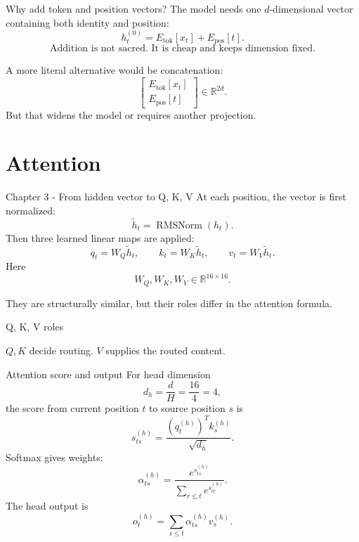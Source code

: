 \documentclass[
  xcolor={svgnames,dvipsnames},
  hyperref={pagebackref,bookmarks},
  aspectratio=169,
  11pt
]{beamer}
\begin{document}
\begin{frame}{Why add token and position vectors?}
The model needs one $d$-dimensional vector containing both identity and position:
\[
h_t^{(0)}=E_{\mathrm{tok}}[x_t]+E_{\mathrm{pos}}[t].
\]
\[
\boxed{\text{Addition is not sacred. It is cheap and keeps dimension fixed.}}
\]

\vspace{0.3cm}
A more literal alternative would be concatenation:
\[
\begin{bmatrix}E_{\mathrm{tok}}[x_t]\\E_{\mathrm{pos}}[t]\end{bmatrix}\in\mathbb R^{2d}.
\]
But that widens the model or requires another projection.
\end{frame}

\section{Attention}
\begin{frame}{Chapter 3 - From hidden vector to Q, K, V}
At each position, the vector is first normalized:
\[
\tilde h_t=\operatorname{RMSNorm}(h_t).
\]
Then three learned linear maps are applied:
\[
q_t=W_Q\tilde h_t,\qquad k_t=W_K\tilde h_t,\qquad v_t=W_V\tilde h_t.
\]
Here
\[
W_Q,W_K,W_V\in\mathbb R^{16\times16}.
\]

They are structurally similar, but their roles differ in the attention formula.
\end{frame}

\begin{frame}{Q, K, V roles}
\centering
{}

\vspace{0.5cm}
$Q,K$ decide routing. $V$ supplies the routed content.
\end{frame}

\begin{frame}{Attention score and output}
For head dimension
\[
d_h=\frac{d}{H}=\frac{16}{4}=4,
\]
the score from current position $t$ to source position $s$ is
\[
s_{ts}^{(h)}=\frac{(q_t^{(h)})^T k_s^{(h)}}{\sqrt{d_h}}.
\]
Softmax gives weights:
\[
\alpha_{ts}^{(h)}=\frac{e^{s_{ts}^{(h)}}}{\sum_{r\le t}e^{s_{tr}^{(h)}}}.
\]
The head output is
\[
o_t^{(h)}=\sum_{s\le t}\alpha_{ts}^{(h)}v_s^{(h)}.
\]
\end{frame}
\end{document}
